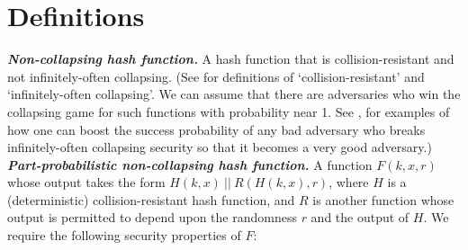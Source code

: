 \documentclass{article}
\begin{document}
\section{Definitions}
\textbf{\textit{Non-collapsing hash function.}} A hash function that is collision-resistant and not infinitely-often collapsing. (See \cite{zha17} for definitions of `collision-resistant' and `infinitely-often collapsing'. We can assume that there are adversaries who win the collapsing game for such functions with probability near 1. See \cite{gyz}, \cite{zha17} for examples of how one can boost the success probability of any bad adversary who breaks infinitely-often collapsing security so that it becomes a very good adversary.) \\

\noindent \textbf{\textit{Part-probabilistic non-collapsing hash function.}} A function $F(k, x, r)$ whose output takes the form $H(k, x) \: || \: R( H(k, x), r)$, where $H$ is a (deterministic) collision-resistant hash function, and $R$ is another function whose output is permitted to depend upon the randomness $r$ and the output of $H$. We require the following security properties of $F$:
\end{document}

